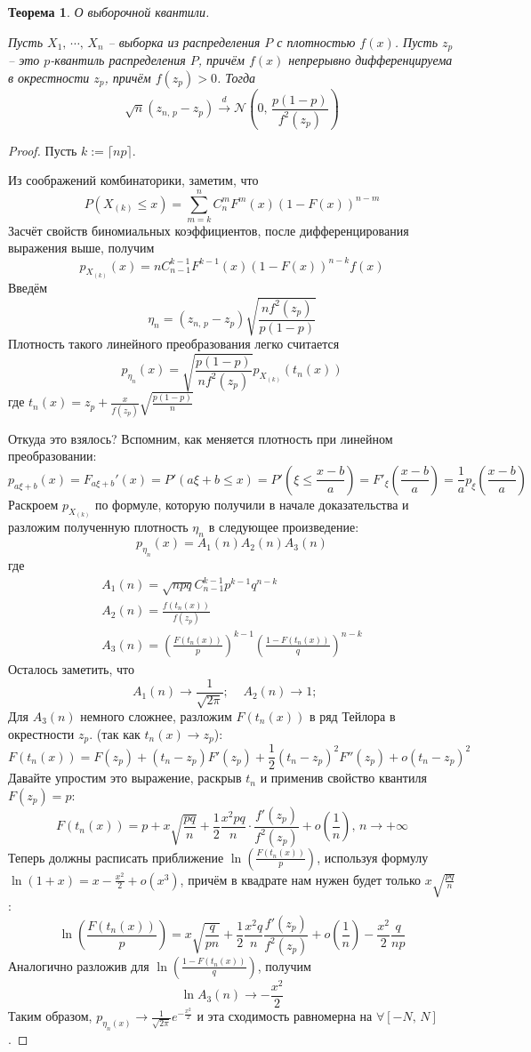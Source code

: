 \documentclass[a4paper,12pt]{article}
\renewcommand{\leq}{\ensuremath{\leqslant}}
\theoremstyle{plain}
\newtheorem{theorem}{Теорема}[section]
\theoremstyle{definition}
\theoremstyle{remark}
\begin{document}
\begin{theorem}
  О выборочной квантили.

  Пусть $X_1,\,\cdots,\,X_n$ -- выборка из распределения $P$ с плотностью $f(x)$. Пусть $z_p$ -- это $p$-квантиль распределения $P$, причём $f(x)$ непрерывно дифференцируема в окрестности $z_p$, причём $f(z_p) > 0$. Тогда
  \[
    \sqrt{n}(z_{n,\,p} - z_p) \overset{d}{\to} \mathcal{N}\left(0,\, \frac{p(1 - p)}{f^2(z_p)}\right)
  \]
\end{theorem}

\begin{proof}
  Пусть $k := \lceil np\rceil$.
  
  Из соображений комбинаторики, заметим, что
  \[
    P(X_{(k)} \leq x) = \sum_{m = k}^n C_n^m F^m(x)(1 - F(x))^{n - m}
  \]
  Засчёт свойств биномиальных коэффициентов, после дифференцирования выражения выше, получим
  \[
    p_{X_{(k)}}(x) = nC_{n-1}^{k-1}F^{k - 1}(x)(1 - F(x))^{n - k}f(x)
  \]
  Введём
  \[
    \eta_n = (z_{n,\,p} - z_p)\sqrt{\frac{nf^2(z_p)}{p(1 - p)}}
  \]
  Плотность такого линейного преобразования легко считается
  \[
    p_{\eta_n}(x) = \sqrt{\frac{p(1 - p)}{nf^2(z_p)}}p_{X_{(k)}}(t_n(x))
  \]
  где $t_n(x) = z_p + \frac{x}{f(z_p)}\sqrt{\frac{p(1 - p)}{n}}$

  Откуда это взялось? Вспомним, как меняется плотность при линейном преобразовании:
  \[
    p_{a\xi + b}(x) = F_{a\xi + b}'(x) = P'(a\xi + b \leq x) = P'(\xi \leq \frac{x - b}{a}) = F'_\xi(\frac{x - b}{a}) = \frac{1}{a}p_\xi(\frac{x - b}{a})
  \]
  Раскроем $p_{X_{(k)}}$ по формуле, которую получили в начале доказательства и разложим полученную плотность $\eta_n$ в следующее произведение:
  \[
    p_{\eta_n}(x) = A_1(n)A_2(n)A_3(n)
  \]
  где 
  \begin{align*}
  A_1(n) = \sqrt{npq}C_{n - 1}^{k - 1}p^{k - 1}q^{n - k}\\
  A_2(n) = \frac{f(t_n(x))}{f(z_p)}\\
  A_3(n) = \left(\frac{F(t_n(x))}{p}\right)^{k - 1}\left(\frac{1 - F(t_n(x))}{q}\right)^{n - k}
  \end{align*}
  Осталось заметить, что
  \[
    A_1(n) \to \frac{1}{\sqrt{2\pi}};\;\;\;\; A_2(n) \to 1;\;\;\;\; 
  \]
  Для $A_3(n)$ немного сложнее, разложим $F(t_n(x))$ в ряд Тейлора в окрестности $z_p$. (так как $t_n(x) \to z_p$):
  \[
    F(t_n(x)) = F(z_p) + (t_n - z_p)F'(z_p) + \frac{1}{2}(t_n - z_p)^2F''(z_p) + o(t_n - z_p)^2
  \]
  Давайте упростим это выражение, раскрыв $t_n$ и применив свойство квантиля $F(z_p) = p$:
  \[
    F(t_n(x)) = p + x\sqrt{\frac{pq}{n}} + \frac{1}{2}\frac{x^2pq}{n}\cdot\frac{f'(z_p)}{f^2(z_p)} + o(\frac{1}{n}),\, n \to +\infty
  \]
  Теперь должны расписать приближение $\ln\left(\frac{F(t_n(x))}{p}\right)$, используя формулу $\ln(1 + x) = x - \frac{x^2}{2} + o(x^3)$, причём в квадрате нам нужен будет только $x\sqrt{\frac{pq}{n}}$:
  \[
    \ln\left(\frac{F(t_n(x))}{p}\right) = x\sqrt{\frac{q}{pn}} + \frac{1}{2}\frac{x^2q}{n}\frac{f'(z_p)}{f^2(z_p)} + o\left(\frac{1}{n}\right) - \frac{x^2}{2}\frac{q}{np}
  \]
  Аналогично разложив для $\ln\left(\frac{1 - F(t_n(x))}{q}\right)$, получим
  \[
    \ln A_3(n) \to -\frac{x^2}{2}
  \]
  Таким образом, $p_{\eta_n(x)} \to \frac{1}{\sqrt{2\pi}}e^{-\frac{x^2}{2}}$ и эта сходимость равномерна на $\forall [-N,\, N]$.


\end{proof}
\end{document}
